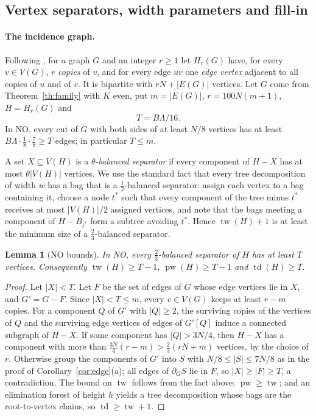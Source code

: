 \documentclass[11pt,letterpaper]{article}
\newtheorem{lemma}[theorem]{Lemma}
\theoremstyle{definition}
\theoremstyle{remark}
\DeclareMathOperator{\tw}{tw}
\DeclareMathOperator{\pw}{pw}
\DeclareMathOperator{\td}{td}
\begin{document}
\subsection{Vertex separators, width parameters and fill-in}\label{sec:vertex}

\paragraph{The incidence graph.}
Following \cite{apw12,wapl14}, for a graph \(G\) and an integer \(r\ge1\)
let \(H_r(G)\) have, for every \(v\in V(G)\), \(r\) \emph{copies} of \(v\),
and for every edge \(uv\) one \emph{edge vertex} adjacent to all copies of
\(u\) and of \(v\). It is bipartite with \(rN+|E(G)|\) vertices. Let \(G\)
come from Theorem~\ref{th:family} with \(K\) even, put \(m=|E(G)|\),
\(r=100N(m+1)\), \(H=H_r(G)\) and
\[
T=B\Lambda/16 .
\]
In NO, every cut of \(G\) with both sides of at least \(N/8\) vertices has
at least \(B\Lambda\cdot\frac18\cdot\frac78\ge T\) edges; in particular
\(T\le m\).

A set \(X\subseteq V(H)\) is a \emph{\(\theta\)-balanced separator} if every
component of \(H-X\) has at most \(\theta|V(H)|\) vertices. We use the
standard fact that every tree decomposition of width \(w\) has a bag that
is a \(\tfrac12\)-balanced separator: assign each vertex to a bag containing
it, choose a node \(t^*\) such that every component of the tree minus
\(t^*\) receives at most \(|V(H)|/2\) assigned vertices, and note that the
bags meeting a component of \(H-B_{t^*}\) form a subtree avoiding \(t^*\).
Hence \(\tw(H)+1\) is at least the minimum size of a \(\tfrac23\)-balanced
separator.

\begin{lemma}[NO bounds]\label{lem:sepNO}
In NO, every \(\tfrac23\)-balanced separator of \(H\) has at least \(T\)
vertices. Consequently \(\tw(H)\ge T-1\), \(\pw(H)\ge T-1\) and
\(\td(H)\ge T\).
\end{lemma}

\begin{proof}
Let \(|X|<T\). Let \(F\) be the set of edges of \(G\) whose edge vertices lie
in \(X\), and \(G'=G-F\). Since \(|X|<T\le m\), every \(v\in V(G)\) keeps at
least \(r-m\) copies. For a component \(Q\) of \(G'\) with \(|Q|\ge2\), the
surviving copies of the vertices of \(Q\) and the surviving edge vertices of
edges of \(G'[Q]\) induce a connected subgraph of \(H-X\). If some component
has \(|Q|>3N/4\), then \(H-X\) has a component with more than
\(\frac{3N}4(r-m)>\frac23(rN+m)\) vertices, by the choice of \(r\). Otherwise
group the components of \(G'\) into \(S\) with \(N/8\le|S|\le7N/8\) as in
the proof of Corollary~\ref{cor:edge}(a); all edges of \(\partial_GS\) lie
in \(F\), so \(|X|\ge|F|\ge T\), a contradiction. The bound on \(\tw\)
follows from the fact above; \(\pw\ge\tw\); and an elimination forest of
height \(h\) yields a tree decomposition whose bags are the root-to-vertex
chains, so \(\td\ge\tw+1\).
\end{proof}
\end{document}
